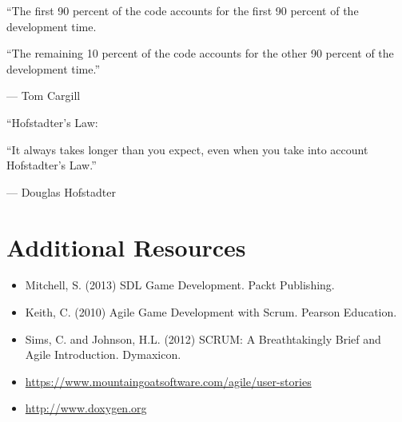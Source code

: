 \documentclass{../fal_assignment}
\begin{document}
\begin{marginquote}
    ``The first 90 percent of the code accounts for the first 90 percent of the development time.
    
    ``The remaining 10 percent of the code accounts for the other 90 percent of the development time.''
    
    --- Tom Cargill
    
    \marginquoterule
    
    ``Hofstadter's Law:
    
    ``It always takes longer than you expect, even when you take into account Hofstadter's Law.''
    
    --- Douglas Hofstadter
\end{marginquote}
\section*{Additional Resources}

\begin{itemize}
    \item Mitchell, S. (2013) SDL Game Development. Packt Publishing.
    \item Keith, C. (2010) Agile Game Development with Scrum. Pearson Education.
    \item Sims, C. and Johnson, H.L. (2012) SCRUM: A Breathtakingly Brief and Agile Introduction. Dymaxicon.
    \item \url{https://www.mountaingoatsoftware.com/agile/user-stories}
    \item \url{http://www.doxygen.org}
\end{itemize}
\end{document}
